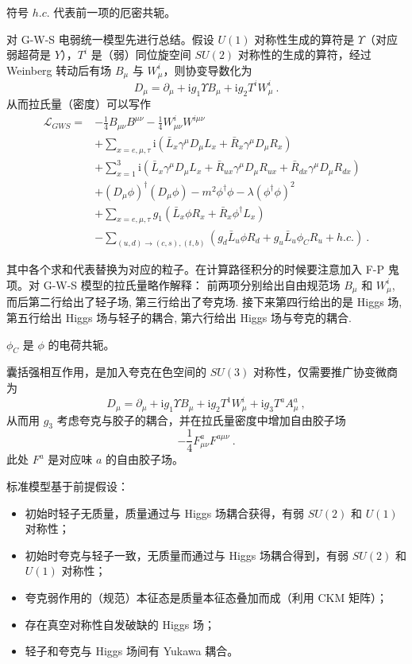 
\begin{issues}
\issueMissDepend
\issueAbstract
\end{issues}

符号 $h.c.$ 代表前一项的厄密共轭。

对 G-W-S 电弱统一模型先进行总结。假设 $U(1)$ 对称性生成的算符是 $\Upsilon$（对应弱超荷是 $Y$），$T^i$ 是（弱）同位旋空间 $SU(2)$ 对称性的生成的算符，经过 Weinberg 转动后有场 $B_\mu$ 与 $W^i_\mu$，则协变导数化为 
\begin{equation}
D_\mu = \partial_\mu + \mathrm i g_1 \Upsilon B_\mu + \mathrm i g_2 T^i W_\mu^i~.
\end{equation}
从而拉氏量（密度）可以写作 
\begin{equation}
	\begin{aligned}
		\mathcal L_{GWS} =& -\frac{1}{4} B_{\mu\nu} B^{\mu\nu} - \frac{1}{4} W_{\mu\nu}^i W^{i\mu\nu}\\
		&+ \sum_{x = e, \mu, \tau} \mathrm i \left(\bar{L}_x \gamma^\mu D_\mu L_x + \bar{R}_x \gamma^\mu D_\mu R_x\right)\\
		&+ \sum_{x=1}^3 \mathrm i \left(\bar{L}_{x} \gamma^\mu D_\mu L_x + \bar{R}_{ux} \gamma^\mu D_\mu R_{ux} + \bar{R}_{dx} \gamma^\mu D_\mu R_{dx}\right) \\
		&+(D_\mu \phi)^\dagger (D_\mu \phi) - m^2 \phi^\dagger \phi - \lambda (\phi^\dagger \phi)^2 \\
		&+ \sum_{x = e, \mu, \tau} g_1 \left(\bar{L}_x \phi R_x + \bar{R}_x \phi^\dagger L_x\right) \\
		&- \sum_{(u, d) \to (c, s), (t, b)} \left(g_d \bar{L}_u \phi R_d + g_u \bar{L}_u \phi_C R_u + h.c.\right) ~.
	\end{aligned}
\end{equation}

其中各个求和代表替换为对应的粒子。在计算路径积分的时候要注意加入 F-P 鬼项。对 G-W-S 模型的拉氏量略作解释：
前两项分别给出自由规范场 $B_\mu$ 和 $W_\mu^i$, 而后第二行给出了轻子场, 第三行给出了夸克场.
接下来第四行给出的是 Higgs 场, 第五行给出 Higgs 场与轻子的耦合, 第六行给出 Higgs 场与夸克的耦合.

$\phi_C$ 是 $\phi$ 的电荷共轭。

囊括强相互作用，是加入夸克在色空间的 $SU(3)$ 对称性，仅需要推广协变微商为 
\begin{equation}
	D_\mu = \partial_\mu + \mathrm i g_1 \Upsilon B_\mu + \mathrm i g_2 T^1 W_\mu^i + \mathrm i g_3 T^a A^a_\mu ~,
\end{equation}
从而用 $g_3$ 考虑夸克与胶子的耦合，并在拉氏量密度中增加自由胶子场
\begin{equation}
	-\frac14 F_{\mu\nu}^a F^{a\mu\nu} ~.
\end{equation}
此处 $F^a$ 是对应味 $a$ 的自由胶子场。

标准模型基于前提假设：
\begin{itemize}
	\item 初始时轻子无质量，质量通过与 Higgs 场耦合获得，有弱 $SU(2)$ 和 $U(1)$ 对称性；
	\item 初始时夸克与轻子一致，无质量而通过与 Higgs 场耦合得到，有弱 $SU(2)$ 和 $U(1)$ 对称性；
	\item 夸克弱作用的（规范）本征态是质量本征态叠加而成（利用 CKM 矩阵）；
	\item 存在真空对称性自发破缺的 Higgs 场；
	\item 轻子和夸克与 Higgs 场间有 Yukawa 耦合。
\end{itemize}